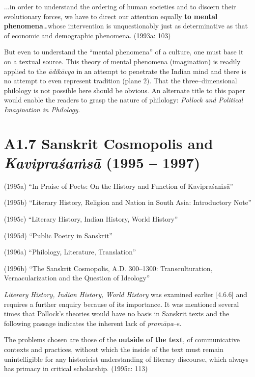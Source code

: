 \begin{myquote}
...in order to understand the ordering of human societies and to discern their evolutionary forces, we have to direct our attention equally \textbf{to mental phenomena}…whose intervention is unquestionably just as determinative as that of economic and demographic phenomena. (1993a: 103)
\end{myquote}

But even to understand the “mental phenomena” of a culture, one must base it on a textual source. This theory of mental phenomena (imagination) is readily applied to the \textit{ādikāvya} in an attempt to penetrate the Indian mind and there is no attempt to even represent tradition (plane 2). That the three–dimensional philology is not possible here should be obvious. An alternate title to this paper would enable the readers to grasp the nature of philology: \textit{Pollock and Political Imagination in Philology}.


\section*{A1.7 Sanskrit Cosmopolis and \textit{Kavipraśaṁsā} (1995 – 1997)}

(1995a) “In Praise of Poets: On the History and Function of Kavipraśaṁsā”

(1995b) “Literary History, Religion and Nation in South Asia: Introductory Note”

(1995c) “Literary History, Indian History, World History”

(1995d) “Public Poetry in Sanskrit”

(1996a) “Philology, Literature, Translation”

(1996b) “The Sanskrit Cosmopolis, A.D. 300–1300: Transculturation, Vernacularization and the Question of Ideology”

\textit{Literary History, Indian History, World History }was examined earlier [4.6.6] and requires a further enquiry because of its importance. It was mentioned several times that Pollock’s theories would have no basis in Sanskrit texts and the following passage indicates the inherent lack of \textit{pramāṇa}–s.

\begin{myquote}
The problems chosen are those of the \textbf{outside of the text}, of communicative contexts and practices, without which the inside of the text must remain unintelligible for any historicist understanding of literary discourse, which always has primacy in critical scholarship. (1995c: 113)
\end{myquote}

